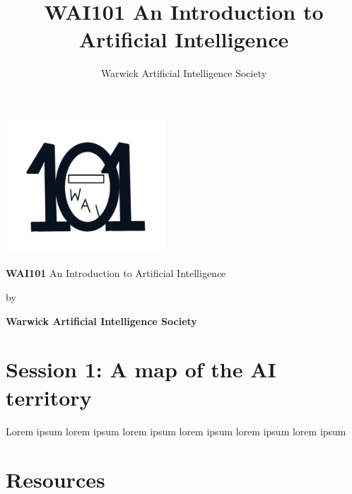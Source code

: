 \documentclass[11pt]{report}
\title{\textbf{WAI101} An Introduction to Artificial Intelligence}
\author{Warwick Artificial Intelligence Society}
\begin{document}
\begin{titlepage}
	\centering
	{\includegraphics[width=6cm]{wai101_logo}\par}
	\vspace{2cm}
	{\huge\textbf{WAI101} An Introduction to Artificial Intelligence\par}
	\vspace{1cm}
	{\Large by \par}
	\vspace{1cm}
	{\Large\bf Warwick Artificial Intelligence Society\par}
	\vfill

\end{titlepage}

\tableofcontents

\chapter{Session 1: A map of the AI territory}
Lorem ipsum lorem ipsum lorem ipsum lorem ipsum lorem ipsum lorem ipsum

\chapter{Resources}
\end{document}
